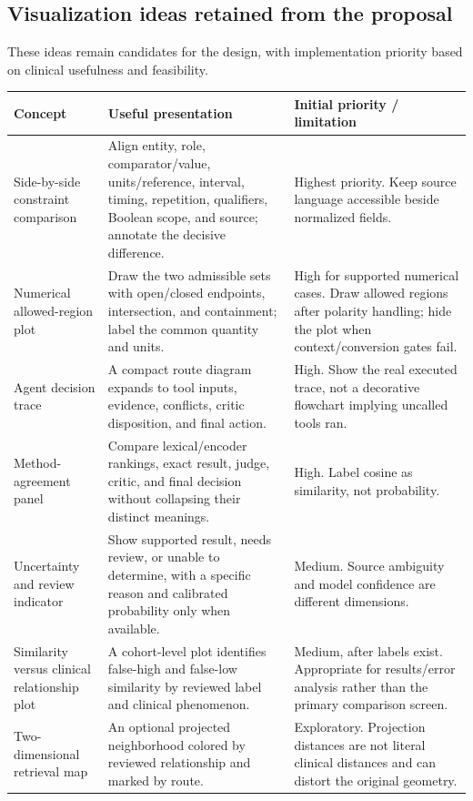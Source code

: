 \documentclass[10pt,letterpaper]{article}
\begin{document}
\subsection{Visualization ideas retained from the proposal}
These ideas remain candidates for the design, with implementation priority
based on clinical usefulness and feasibility.
\begin{longtable}{L{.23\linewidth}L{.42\linewidth}L{.26\linewidth}}
\toprule Concept & Useful presentation & Initial priority / limitation\\\midrule
\endhead
Side-by-side constraint comparison & Align entity, role, comparator/value, units/reference, interval, timing, repetition, qualifiers, Boolean scope, and source; annotate the decisive difference. & Highest priority. Keep source language accessible beside normalized fields.\\
Numerical allowed-region plot & Draw the two admissible sets with open/closed endpoints, intersection, and containment; label the common quantity and units. & High for supported numerical cases. Draw allowed regions after polarity handling; hide the plot when context/conversion gates fail.\\
Agent decision trace & A compact route diagram expands to tool inputs, evidence, conflicts, critic disposition, and final action. & High. Show the real executed trace, not a decorative flowchart implying uncalled tools ran.\\
Method-agreement panel & Compare lexical/encoder rankings, exact result, judge, critic, and final decision without collapsing their distinct meanings. & High. Label cosine as similarity, not probability.\\
Uncertainty and review indicator & Show supported result, needs review, or unable to determine, with a specific reason and calibrated probability only when available. & Medium. Source ambiguity and model confidence are different dimensions.\\
Similarity versus clinical relationship plot & A cohort-level plot identifies false-high and false-low similarity by reviewed label and clinical phenomenon. & Medium, after labels exist. Appropriate for results/error analysis rather than the primary comparison screen.\\
Two-dimensional retrieval map & An optional projected neighborhood colored by reviewed relationship and marked by route. & Exploratory. Projection distances are not literal clinical distances and can distort the original geometry.\\\bottomrule
\end{longtable}
\end{document}

